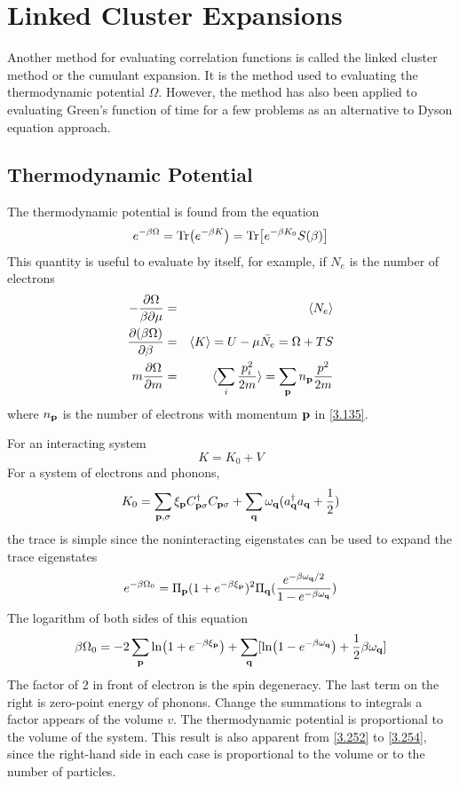 \section{Linked Cluster Expansions}\label{s3.6}
Another method for evaluating correlation functions is called the linked cluster method or the cumulant expansion.
It is the method used to evaluating the thermodynamic potential $\Omega$.
However, the method has also been applied to evaluating Green's function of time for a few problems as an alternative to Dyson equation approach.

\subsection{Thermodynamic Potential}
The thermodynamic potential is found from the equation
\begin{equation}
    e^{-\beta \Omega} = \Tr (e^{-\beta K} ) = \Tr[e^{-\beta K_0}S(\beta)]   \label{3.251}
\end{equation}
This quantity is useful to evaluate by itself, for example, if $N_e$ is the number of electrons
\begin{eqnarray}
    - \frac{\partial \Omega}{\beta \partial \mu} &=& \langle N_e \rangle  \label{3.252} \\
    \frac{\partial (\beta \Omega)}{\partial \beta} &=& \langle K \rangle = U - \mu \bar{N_e} = \Omega + TS \label{3.253} \\
    m \frac{\partial \Omega}{\partial m} &=& \langle \sum_i \frac{p_i^2}{2m} \rangle = \sum_{\mathbf{p}} n_{\mathbf{p}} \frac{p^2}{2m}     \label{3.254}
\end{eqnarray}
where $n_{\mathbf{p}}$ is the number of electrons with momentum $\mathbf{p}$ in \eqref{3.135}.

For an interacting system
\begin{equation}
    K = K_0 + V \label{3.256}
\end{equation}
For a system of electrons and phonons,
\begin{equation}
    K_0 = \sum_{\mathbf{p},\sigma} \xi_{\mathbf{p}} C^\dagger_{\mathbf{p}\sigma} C_{\mathbf{p}\sigma} + \sum_{\mathbf{q}} \omega_{\mathbf{q}} (a^\dagger_{\mathbf{q}} a_{\mathbf{q}} + \frac{1}{2} )  \label{3.258}
\end{equation}
the trace is simple since the noninteracting eigenstates can be used to expand the trace eigenstates
\begin{equation}
    e^{-\beta \Omega_0} = \Pi_{\mathbf{p}} (1 + e^{-\beta \xi_{\mathbf{p}}})^2 \Pi_{\mathbf{q}} ( \frac{e^{-\beta \omega_{\mathbf{q}}/2}}{1 - e^{-\beta \omega_{\mathbf{q}}}} )  \label{3.259}
\end{equation}
The logarithm of both sides of this equation
\begin{equation}
    \beta \Omega_0 = -2 \sum_{\mathbf{p}} \ln (1 + e^{-\beta \xi_{\mathbf{p}}}) + \sum_{\mathbf{q}} [ \ln(1- e^{-\beta \omega_{\mathbf{q}}}) + \frac{1}{2} \beta \omega_{\mathbf{q}}]
\end{equation}
The factor of $2$ in front of electron is the spin degeneracy.
The last term on the right is zero-point energy of phonons.
Change the summations to integrals a factor appears of the volume $v$.
The thermodynamic potential is proportional to the volume of the system.
This result is also apparent from \eqref{3.252} to \eqref{3.254}, since the right-hand side in each case is proportional to the volume or to the number of particles.

